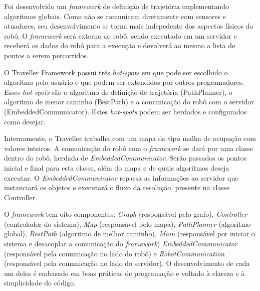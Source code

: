 Foi desenvolvido um \textit{framework} de definição de trajetória implementando algoritmos globais. Como não se comunicam diretamente com sensores e atuadores, seu desenvolvimento se torna mais indepedente dos aspectos físicos do robô. O \textit{framework} será externo ao robô, sendo executado em um servidor e receberá os dados do robô para a execução e devolverá ao mesmo a lista de pontos a serem percorridos.

O Traveller Framework possui três \textit{hot-spots} em que pode ser escolhido o algoritmo pelo usuário e que podem ser extendidos por outros programadores. Esses \textit{hot-spots} são o algoritmo de definição de trajetória (PathPlanner), o algoritmo de menor caminho (BestPath) e a comunicação do robô com o servidor (EmbeddedCommunicator). Estes \textit{hot-spots} podem ser herdados e configurados como desejar.

Internamente, o Traveller trabalha com um mapa do tipo malha de ocupação com valores inteiros. A comunicação do robô com o \textit{framework} se dará por uma classe dentro do robô, herdada de \textit{EmbeddedCommunicator}. Serão passados os pontos inicial e final para esta classe, além do mapa e de quais algoritmos deseja executar. O \textit{EmbeddedCommunicator} repassa as informações ao servidor que instanciará os objetos e executará o fluxo da resolução, presente na classe Controller.

O \textit{framework} tem oito componentes: \textit{Graph} (responsável pelo grafo), \textit{Controller} (controlador do sistema), \textit{Map} (responsável pelo mapa), \textit{PathPlanner} (algoritmo global), \textit{BestPath} (algoritmo de melhor caminho),  \textit{Main} (responsável por iniciar o sistema e desacoplar a comunicação do \textit{framework}) \textit{EmbeddedCommunicator} (responsável pela comunicação no lado do robô) e \textit{RobotCommunication} (responsável pela comunicação no lado do servidor). O desenvolvimento de cada um deles é embasado em boas práticas de programação e voltado à clareza e à simplicidade do código.
